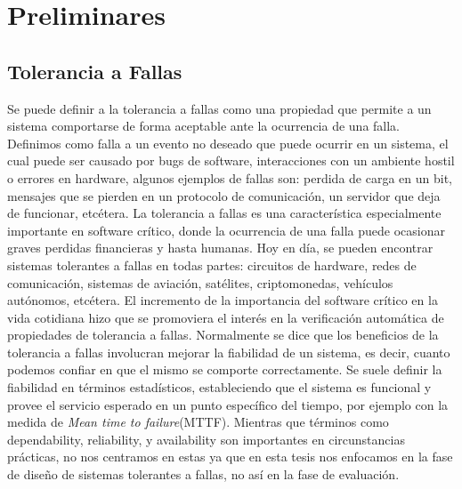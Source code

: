 \chapter{Preliminares}
\label{cap:preliminares}
\section{Tolerancia a Fallas}
Se puede definir a la tolerancia a fallas como una propiedad que permite a un sistema comportarse de forma aceptable ante la ocurrencia de una falla. Definimos como falla a un evento no deseado que puede ocurrir en un sistema, el cual puede ser causado por bugs de software, interacciones con un ambiente hostil o errores en hardware, algunos ejemplos de fallas son: perdida de carga en un bit, mensajes que se pierden en un protocolo de comunicación, un servidor que deja de funcionar, etcétera.
La tolerancia a fallas es una característica especialmente importante en software crítico, donde la ocurrencia de una falla puede ocasionar graves perdidas financieras y hasta humanas.
Hoy en día, se pueden encontrar sistemas tolerantes a fallas en todas partes: circuitos de hardware, redes de comunicación, sistemas de aviación, satélites, criptomonedas, vehículos autónomos, etcétera.
El incremento de la importancia del software crítico en la vida cotidiana hizo que se promoviera el interés en la verificación automática de propiedades de tolerancia a fallas.
Normalmente se dice que los beneficios de la tolerancia a fallas involucran mejorar la fiabilidad de un sistema, es decir, cuanto podemos confiar en que el mismo se comporte correctamente. Se suele definir la fiabilidad en términos estadísticos, estableciendo que el sistema es funcional y provee el servicio esperado en un punto específico del tiempo, por ejemplo con la medida de \emph{Mean time to failure}(MTTF). Mientras que términos como
dependability, reliability, y availability son importantes en circunstancias prácticas,
no nos centramos en estas ya que en esta tesis nos enfocamos en la fase de diseño de sistemas tolerantes a fallas, no así en la fase de evaluación.

